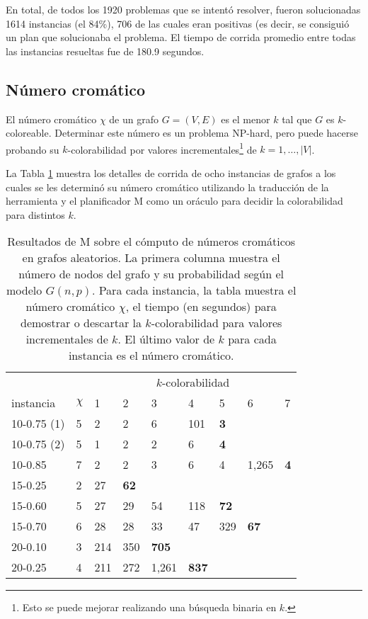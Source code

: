 En total, de todos los 1920 problemas que se intentó resolver, fueron
solucionadas 1614 instancias (el 84\%), 706 de las cuales eran positivas (es
decir, se consiguió un plan que solucionaba el problema. El tiempo de corrida
promedio entre todas las instancias resueltas fue de 180.9 segundos.

\subsection{Número cromático}

El número cromático $\chi$ de un grafo $G=(V,E)$ es el menor $k$ tal que $G$ es
$k$-coloreable. Determinar este número es un problema NP-hard, pero puede
hacerse probando su $k$-colorabilidad por valores incrementales\footnote{Esto
se puede mejorar realizando una búsqueda binaria en $k$.} de
$k=1,\ldots,|V|$.

La Tabla \ref{chromatic} muestra los detalles de corrida de ocho instancias de
grafos a los cuales se les determinó su número cromático utilizando la
traducción de la herramienta y el planificador M como un oráculo para decidir
la colorabilidad para distintos $k$.

\begin{table}[h!]
\centering
\small
\begin{tabular}{lllllllll}
       &       & \multicolumn{7}{c}{$k$-colorabilidad} \\
\cmidrule(l){3-9}
instancia      & $\chi$ &     1 &     2 &     3 &     4 &     5 &     6 &     7 \\
\midrule
10-0.75 (1)      &      5 &     2 &     2 &     6 &   101 &\bf  3 &       &       \\
10-0.75 (2)      &      5 &     1 &     2 &     2 &     6 &\bf  4 &       &       \\
10-0.85        &      7 &     2 &     2 &     3 &     6 &     4 & 1,265 &\bf  4 \\
15-0.25        &      2 &    27 &\bf 62 &       &       &       &       &       \\
15-0.60        &      5 &    27 &    29 &    54 &   118 &\bf 72 &       &       \\
15-0.70        &      6 &    28 &    28 &    33 &    47 &   329 &\bf 67 &       \\
20-0.10        &      3 &   214 &   350 &\bf705 &       &       &       &       \\ %
20-0.25        &      4 &   211 &   272 & 1,261 &\bf837 &       &       &       \\
\midrule
\end{tabular}
\caption[Resultados de M sobre números cromáticos]{
Resultados de M sobre el cómputo de números cromáticos en grafos aleatorios.
La primera columna muestra el número de nodos del grafo y su probabilidad según
el modelo $G(n,p)$.
Para cada instancia, la tabla muestra el número cromático $\chi$, el tiempo
(en segundos) para demostrar o descartar la $k$-colorabilidad para valores
incrementales de $k$.
El último valor de $k$ para cada instancia es el número cromático.}
\label{chromatic}
\end{table}

